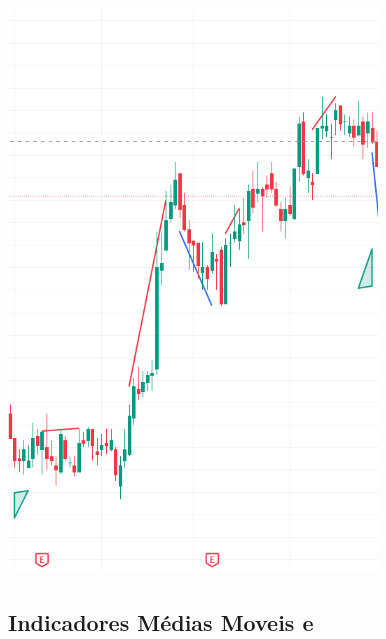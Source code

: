 \documentclass[
  letterpaper,
  DIV=11,
  numbers=noendperiod]{scrartcl}
\begin{document}
\begin{itemize}
  \includegraphics[width=3.85417in,height=\textheight,keepaspectratio]{images/dow2_LSWA.PNG}
\end{itemize}

\subsection{Indicadores Médias Moveis
e}\label{indicadores-muxe9dias-moveis-e}
\end{document}
